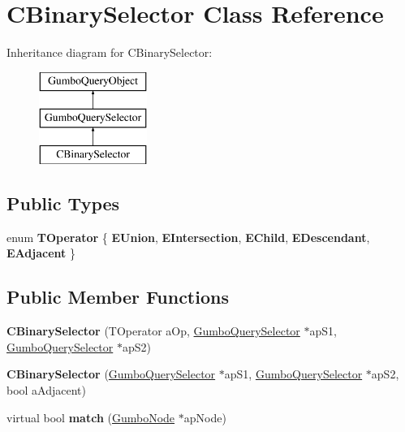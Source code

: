 \hypertarget{class_c_binary_selector}{}\section{C\+Binary\+Selector Class Reference}
\label{class_c_binary_selector}
Inheritance diagram for C\+Binary\+Selector\+:\begin{figure}[H]
\begin{center}
\leavevmode
\includegraphics[height=3.000000cm]{class_c_binary_selector}
\end{center}
\end{figure}
\subsection*{Public Types}
\begin{DoxyCompactItemize}
\item 
\mbox{\label{class_c_binary_selector_a54a86225036a8d59e8e0fc2792996422}} 
enum {\bfseries T\+Operator} \{ \newline
{\bfseries E\+Union}, 
{\bfseries E\+Intersection}, 
{\bfseries E\+Child}, 
{\bfseries E\+Descendant}, 
\newline
{\bfseries E\+Adjacent}
 \}
\end{DoxyCompactItemize}
\subsection*{Public Member Functions}
\begin{DoxyCompactItemize}
\item 
\mbox{\label{class_c_binary_selector_afedc88ede559f1c2b40b26dc9c1d1bb4}} 
{\bfseries C\+Binary\+Selector} (T\+Operator a\+Op, \mbox{\hyperlink{class_gumbo_query_selector}{Gumbo\+Query\+Selector}} $\ast$ap\+S1, \mbox{\hyperlink{class_gumbo_query_selector}{Gumbo\+Query\+Selector}} $\ast$ap\+S2)
\item 
\mbox{\label{class_c_binary_selector_a2c67e0640d50a81e527590676eb8fd71}} 
{\bfseries C\+Binary\+Selector} (\mbox{\hyperlink{class_gumbo_query_selector}{Gumbo\+Query\+Selector}} $\ast$ap\+S1, \mbox{\hyperlink{class_gumbo_query_selector}{Gumbo\+Query\+Selector}} $\ast$ap\+S2, bool a\+Adjacent)
\item 
\mbox{\label{class_c_binary_selector_a4ebf573be42ac2c0c8ec590926e6bc45}} 
virtual bool {\bfseries match} (\mbox{\hyperlink{gumbo_8h_a5f67d8397fda8fb7c90cc27f14ac4e7d}{Gumbo\+Node}} $\ast$ap\+Node)
\end{DoxyCompactItemize}


